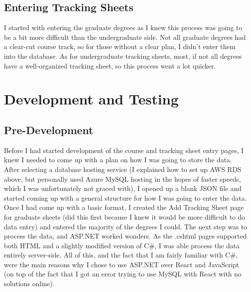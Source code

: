 \documentclass[12pt]{article}
\begin{document}
		\subsection{Entering Tracking Sheets}
			I started with entering the graduate degrees as I knew this process was going to be a bit more difficult than the undergraduate side. Not all graduate degrees had a clear-cut course track, so for those without a clear plan, I didn't enter them into the database. As for undergraduate tracking sheets, most, if not all degrees have a well-organized tracking sheet, so this process went a lot quicker.
			
	\pagebreak
	\section{Development and Testing}
		\subsection{Pre-Development}
			Before I had started development of the course and tracking sheet entry pages, I knew I needed to come up with a plan on how I was going to store the data. After selecting a database hosting service (I explained how to set up AWS RDS above, but personally used Azure MySQL hosting in the hopes of faster speeds, which I was unfortunately not graced with), I opened up a blank JSON file and started coming up with a general structure for how I was going to enter the data. Once I had come up with a basic format, I created the Add Tracking Sheet page for graduate sheets (did this first because I knew it would be more difficult to do data entry) and entered the majority of the degrees I could. The next step was to process the data, and ASP.NET worked wonders. As the .cshtml pages supported both HTML and a slightly modified version of C\#, I was able process the data entirely server-side. All of this, and the fact that I am fairly familiar with C\#, were the main reasons why I chose to use ASP.NET over React and JavaScript (on top of the fact that I got an error trying to use MySQL with React with no solutions online).
		
\end{document}
